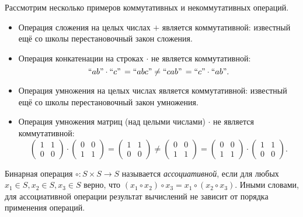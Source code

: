 \begin{example} Рассмотрим несколько примеров коммутативных и некоммутативных операций.
	\begin{itemize}
		\item Операция сложения на целых числах $+$ является коммутативной: известный ещё со школы перестановочный закон сложения.
		\item Операция конкатенации на строках $\cdot$ не является коммутативной: $$``ab" \cdot ``c" \, = ``abc" \neq ``cab" \, = ``c" \cdot ``ab".$$
		\item Операция умножения на целых числах является коммутативной: известный ещё со школы перестановочный закон умножения.
		\item Операция умножения матриц (над целыми числами) $\cdot$ не является коммутативной:
		      $$\begin{pmatrix}
				      1 & 1 \\ 0 & 0
			      \end{pmatrix}
			      \cdot
			      \begin{pmatrix}
				      0 & 0 \\ 1 & 1
			      \end{pmatrix}
			      =
			      \begin{pmatrix}
				      1 & 1 \\ 0 & 0
			      \end{pmatrix}
			      \neq
			      \begin{pmatrix}
				      0 & 0 \\ 1 & 1
			      \end{pmatrix}
			      =
			      \begin{pmatrix}
				      0 & 0 \\ 1 & 1
			      \end{pmatrix}
			      \cdot
			      \begin{pmatrix}
				      1 & 1 \\ 0 & 0
			      \end{pmatrix}
			      .$$
	\end{itemize}
\end{example}

\begin{definition}
	Бинарная операция $\circ : S \times S \to S$ называется \emph{ассоциативной}, если для любых  $x_1 \in S, x_2 \in S, x_3 \in S$ верно, что  $(x_1 \circ x_2) \circ x_3 = x_1 \circ (x_2 \circ x_3)$. Иными словами, для ассоциативной операции результат вычислений не зависит от порядка применения операций.
\end{definition}

